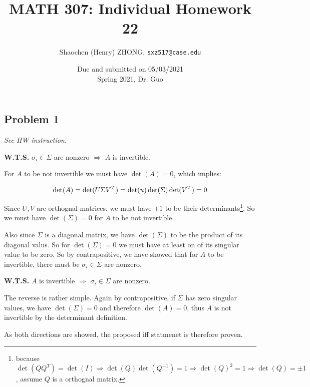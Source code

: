 \documentclass[11pt]{article}
\newcommand{\ilc}{\texttt}
\begin{document}
\title{\textbf{MATH 307: Individual Homework 22}}


\author{Shaochen (Henry) ZHONG, \ilc{sxz517@case.edu}}

\date{Due and submitted on 05/03/2021 \\ Spring 2021, Dr. Guo}
\maketitle



\subsection*{Problem 1}
\textit{See HW instruction.}\newline

\noindent\textbf{W.T.S.}  $\sigma_i \in \Sigma$ are nonzero $\Longrightarrow$ $A$ is invertible.

For $A$ to be not invertible we must have $\det(A) = 0$, which implies:

\begin{equation*}
    \det(A) = \det(U \Sigma V^T) = \det(u) \det(\Sigma)  \det(V^T) = 0 \\
\end{equation*}

Since $U, V$ are orthognal matrices, we must have $\pm 1$ to be their determinants\footnote{because $\det(Q Q^T) = \det(I) \Longrightarrow \det(Q) \det(Q^{-1}) = 1 \Longrightarrow \det(Q)^2  =  1 \Longrightarrow \det(Q) = \pm 1$, assume $Q$ is a orthognal matrix.}. So we must have $\det(\Sigma) = 0$ for $A$ to be not invertible.

Also since $\Sigma$ is a diagonal matrix, we have $\det(\Sigma)$ to be the product of its diagonal valus. So for $\det(\Sigma) = 0$ we must have at least on of its singular value to be zero. So by contrapositive, we have showed that for $A$ to be invertible, there must be  $\sigma_i \in \Sigma$ are nonzero.\newline

\noindent\textbf{W.T.S.} $A$ is invertible $\Longrightarrow$ $\sigma_i \in \Sigma$ are nonzero.

The reverse is rather simple. Again by contrapositive, if $\Sigma$ has zero singular values, we have $\det(\Sigma) = 0$ and therefore $\det(A) = 0$, thus $A$ is not invertible by the determinant definition.\newline

\noindent As both directions are showed, the proposed iff statmenet is therefore proven.
\end{document}
